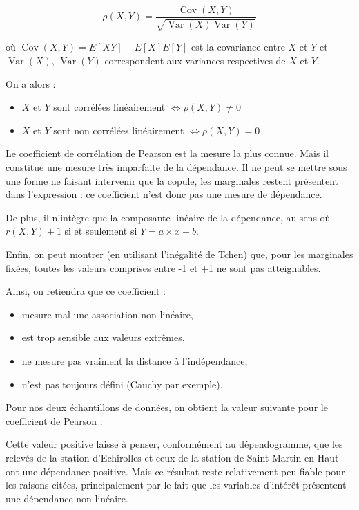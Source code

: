 $$
\rho(X,Y) = \frac{\operatorname{Cov}(X,Y)}{\sqrt{ \operatorname{Var}(X) \operatorname{Var}(Y)}}
$$

où $\operatorname{Cov}(X,Y) = E[XY] - E[X] E[Y]$ est la covariance entre $X$ et $Y$ et $\operatorname{Var}(X)$, $\operatorname{Var}(Y)$ correspondent aux variances respectives
de $X$ et $Y$.

On a alors :

\begin{itemize}
\item $X$ et $Y$ sont corrélées linéairement $\Longleftrightarrow \rho(X,Y) \neq 0$
\item $X$ et $Y$ sont non corrélées linéairement $\Longleftrightarrow \rho(X,Y) = 0$
\end{itemize}

Le coefficient de corrélation de Pearson est la mesure la plus connue. Mais il constitue une mesure très imparfaite de la dépendance. Il ne
peut se mettre sous une forme ne faisant intervenir que la copule, les marginales restent présentent dans l’expression : ce coefficient n’est donc
pas une mesure de dépendance.

De plus, il n’intègre que la composante linéaire de la dépendance, au sens où $r(X,Y) \pm 1$ si et seulement si $Y= a \times x + b$.

Enfin, on peut montrer (en utilisant l'inégalité de Tchen) que, pour les marginales fixées, toutes les valeurs
comprises entre -1 et +1 ne sont pas atteignables.

Ainsi, on retiendra que ce coefficient :

\begin{itemize}
\item mesure mal une association non-linéaire,
\item est trop sensible aux valeurs extrêmes,
\item ne mesure pas vraiment la distance à l'indépendance,
\item n'est pas toujours défini (Cauchy par exemple).
\end{itemize}

Pour nos deux échantillons de données, on obtient la valeur suivante pour le coefficient de Pearson :

\begin{center}
\end{center}

Cette valeur positive laisse à penser, conformément au dépendogramme, que les relevés de la station d'Echirolles et ceux de la station de Saint-Martin-en-Haut ont une dépendance positive. Mais ce résultat reste relativement peu fiable pour les raisons citées, principalement par le fait que les variables d'intérêt présentent une dépendance non linéaire.


